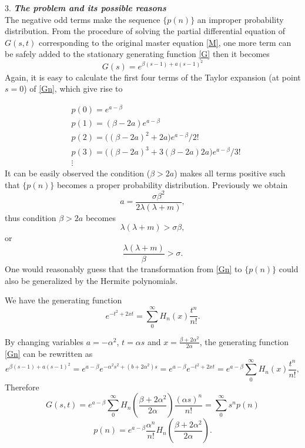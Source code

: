 \documentclass[paper=a4, fontsize=12pt]{scrartcl}	%
\begin{document}
3. {\bf{\it The problem and its possible reasons}}
\\

The negative odd terms make the sequence $\{p(n)\}$ an improper probability distribution. From the procedure of solving the partial differential equation of $G(s, t)$ corresponding to the original master equation \eqref{M}, one more term can be safely added to the stationary generating function \eqref{G} then it becomes
\begin{equation}
G(s) = e^{\beta(s-1)+a(s-1)^2}\label{Gn}
\end{equation}
Again, it is easy to calculate the first four terms of the Taylor expansion (at point $s=0$) of \eqref{Gn}, which give rise to 

\begin{align}
&p(0) = e^{a-\beta}\\
&p(1) =(\beta-2a)e^{a-\beta}\\
&p(2) = \big((\beta -2a)^2+2a\big)e^{a-\beta}/2!\\
&p(3) = \big((\beta -2a)^3+3(\beta-2a)2a\big)e^{a-\beta}/3!\\
&\vdots
\end{align}
It can be easily observed the condition ($\beta>2a$) makes all terms positive such that $\{p(n)\}$ becomes a proper probability distribution. Previously we obtain
\begin{equation}
a=\frac{\sigma\beta^2}{2\lambda(\lambda+m)},
\end{equation}
thus condition $\beta>2a$ becomes
\begin{equation}
\lambda(\lambda+m)>\sigma\beta,
\end{equation}
or
\begin{equation}
\frac{\lambda(\lambda+m)}{\beta}>\sigma.
\end{equation}
One would reasonably guess that the transformation from \eqref{Gn} to $\{p(n)\}$ could also be generalized by the Hermite polynomials. 

We have the generating function
\begin{equation}
e^{-t^2+2xt}=\sum_0^\infty H_n(x)\frac{t^n}{n!}.
\end{equation}

By changing variables $a=-\alpha^2$, $t=\alpha s$ and $x=\frac{\beta+2\alpha^2}{2\alpha}$, the generating function \eqref{Gn} can be rewritten as 
\begin{equation}
e^{\beta(s-1)+a(s-1)^2}=e^{a-\beta}e^{-\alpha^2s^2+(b+2\alpha^2)s}=e^{a-\beta}e^{-t^2+2xt}=e^{a-\beta}\sum_0^\infty H_n(x)\frac{t^n}{n!},
\end{equation}
Therefore
\begin{equation}
G(s, t)=e^{a-\beta}\sum_0^\infty H_n(\frac{\beta+2\alpha^2}{2\alpha})\frac{(\alpha s)^n}{n!}=\sum_0^\infty s^np(n)
\end{equation}
\begin{equation}
p(n)=e^{a-\beta}\frac{\alpha^n}{n!}H_n(\frac{\beta+2\alpha^2}{2\alpha}).
\end{equation}
\end{document}
